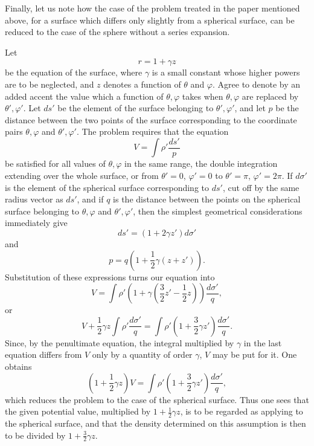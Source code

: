 \documentclass[11pt]{article}
\begin{document}
Finally, let us note how the case of the problem treated in the paper mentioned above, for a surface which differs only slightly from a spherical surface, can be reduced to the case of the sphere without a series expansion.

Let
\[
 r=1+\gamma z
\]
be the equation of the surface, where $\gamma$ is a small constant whose higher powers are to be neglected, and $z$ denotes a function of $\theta$ and $\varphi$. Agree to denote by an added accent the value which a function of $\theta,\varphi$ takes when $\theta,\varphi$ are replaced by $\theta',\varphi'$. Let $ds'$ be the element of the surface belonging to $\theta',\varphi'$, and let $p$ be the distance between the two points of the surface corresponding to the coordinate pairs $\theta,\varphi$ and $\theta',\varphi'$. The problem requires that the equation
\[
 V=\int \rho'\frac{ds'}{p}
\]
be satisfied for all values of $\theta,\varphi$ in the same range, the double integration extending over the whole surface, or from $\theta'=0$, $\varphi'=0$ to $\theta'=\pi$, $\varphi'=2\pi$. If $d\sigma'$ is the element of the spherical surface corresponding to $ds'$, cut off by the same radius vector as $ds'$, and if $q$ is the distance between the points on the spherical surface belonging to $\theta,\varphi$ and $\theta',\varphi'$, then the simplest geometrical considerations immediately give
\[
 ds'=(1+2\gamma z')d\sigma'
\]
and
\[
 p=q\left(1+\frac12\gamma(z+z')\right).
\]
Substitution of these expressions turns our equation into
\[
 V=\int \rho'\left(1+\gamma\left(\frac32z'-\frac12z\right)\right)\frac{d\sigma'}{q},
\]
or
\[
 V+\frac12\gamma z\int \rho'\frac{d\sigma'}{q}
 =\int \rho'\left(1+\frac32\gamma z'\right)\frac{d\sigma'}{q}.
\]
Since, by the penultimate equation, the integral multiplied by $\gamma$ in the last equation differs from $V$ only by a quantity of order $\gamma$, $V$ may be put for it. One obtains
\[
 \left(1+\frac12\gamma z\right)V=\int \rho'\left(1+\frac32\gamma z'\right)\frac{d\sigma'}{q},
\]
which reduces the problem to the case of the spherical surface. Thus one sees that the given potential value, multiplied by $1+\frac12\gamma z$, is to be regarded as applying to the spherical surface, and that the density determined on this assumption is then to be divided by $1+\frac32\gamma z$.
\end{document}
